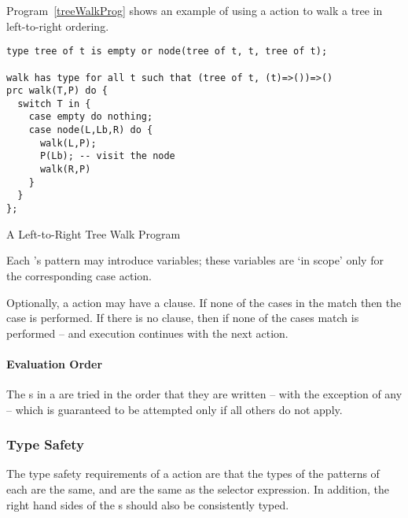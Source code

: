Program~\vref{treeWalkProg} shows an example of using a  action to walk a tree in left-to-right ordering.
\begin{program}
\begin{lstlisting}
type tree of t is empty or node(tree of t, t, tree of t);

walk has type for all t such that (tree of t, (t)=>())=>()
prc walk(T,P) do {
  switch T in {
    case empty do nothing;
    case node(L,Lb,R) do {
      walk(L,P);
      P(Lb); -- visit the node
      walk(R,P)
    }
  }
};
\end{lstlisting}
\caption{A Left-to-Right Tree Walk Program\label{treeWalkProg}}
\end{program}


Each 's pattern may introduce variables; these variables are `in scope' only for the corresponding case action.

Optionally, a  action may have a  clause. If none of the cases in the  match then the  case is performed. If there is no  clause, then if none of the cases match  is performed -- and execution continues with the next action.


\paragraph{Evaluation Order}
The s in a  are tried in the order that they are written -- with the exception of any   -- which is guaranteed to be attempted only if all others do not apply.

\subsubsection{Type Safety}
The type safety requirements of a  action are that the types of the patterns of each  are the same, and are the same as the selector expression. In addition, the right hand sides of the s should also be consistently typed.

\begin{prooftree}
\end{prooftree}

